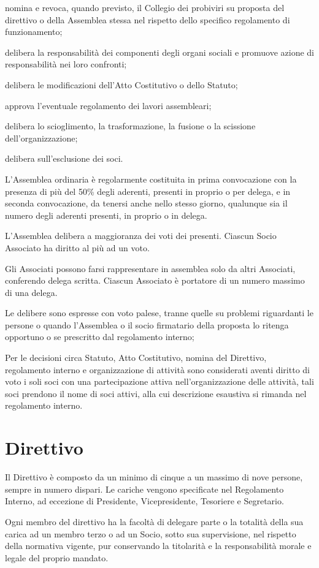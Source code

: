 \documentclass[legalpaper, 11pt]{exam}
\let\tempone\enumerate
\let\temptwo\endenumerate
\renewenvironment{enumerate}{\tempone\addtolength{\itemsep}{-0.45\baselineskip}}{\temptwo}
\begin{document}
\begin{enumerate}
\begin{enumerate}
		\item nomina e revoca, quando previsto, il Collegio dei probiviri su proposta del direttivo o della Assemblea stessa nel rispetto dello specifico regolamento di funzionamento;
		\item delibera la responsabilità dei componenti degli organi sociali e promuove azione di responsabilità nei loro confronti;
		\item delibera le modificazioni dell'Atto Costitutivo o dello Statuto;
		\item approva l'eventuale regolamento dei lavori assembleari;
		\item delibera lo scioglimento, la trasformazione, la fusione o la scissione dell'organizzazione;
		\item delibera sull'esclusione dei soci.
	\end{enumerate}
	\item L'Assemblea ordinaria è regolarmente costituita in prima convocazione con la presenza di più del 50\% degli aderenti, presenti in proprio o per delega, e in seconda convocazione, da tenersi anche nello stesso giorno, qualunque sia il numero degli aderenti presenti, in proprio o in delega.
	\item L'Assemblea delibera a maggioranza dei voti dei presenti. Ciascun Socio Associato ha diritto al più ad un voto.
	\item Gli Associati possono farsi rappresentare in assemblea solo da altri Associati, conferendo delega scritta. Ciascun Associato è portatore di un numero massimo di una delega.
	\item Le delibere sono espresse con voto palese, tranne quelle su problemi riguardanti le persone o quando l’Assemblea o il socio firmatario della proposta lo ritenga opportuno o se prescritto dal regolamento interno;
	\item Per le decisioni circa Statuto, Atto Costitutivo, nomina del Direttivo, regolamento interno e organizzazione di attività sono considerati aventi diritto di voto i soli soci con una partecipazione attiva nell'organizzazione delle attività, tali soci prendono il nome di soci attivi, alla cui descrizione esaustiva si rimanda nel regolamento interno.


\end{enumerate}

\section{Direttivo}
\begin{enumerate}
	\item Il Direttivo è composto da un minimo di cinque a un massimo di nove persone, sempre in numero dispari. Le cariche vengono specificate nel Regolamento Interno, ad eccezione di Presidente, Vicepresidente, Tesoriere e Segretario.
	\item Ogni membro del direttivo ha la facoltà di delegare parte o la totalità della sua carica ad un membro terzo o ad un Socio, sotto sua supervisione, nel rispetto della normativa vigente, pur conservando la titolarità e la responsabilità morale e legale del proprio mandato.
\end{enumerate}
\end{document}
